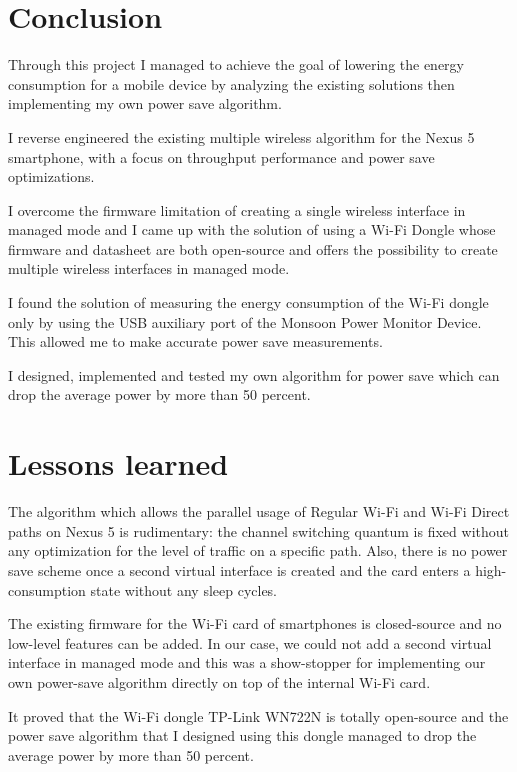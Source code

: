 \section{Conclusion}
\label{sec:conclusion}

Through this project I managed to achieve the goal of lowering the energy consumption for a mobile device by analyzing the existing solutions then implementing my own power save algorithm.

I reverse engineered the existing multiple wireless algorithm for the Nexus 5 smartphone, with a focus on throughput performance and power save optimizations. 

I overcome the firmware limitation of creating a single wireless interface in managed mode and I came up with the solution of using a Wi-Fi Dongle whose firmware and datasheet are both open-source and offers the possibility to create multiple wireless interfaces in managed mode.

I found the solution of measuring the energy consumption of the Wi-Fi dongle only by using the USB auxiliary port of the Monsoon Power Monitor Device. This allowed me to make accurate power save measurements.

I designed, implemented and tested my own algorithm for power save which can drop the average power by more than 50 percent.

\section{Lessons learned}
\label{sec:lessons}

The algorithm which allows the parallel usage of Regular Wi-Fi and Wi-Fi Direct paths on Nexus 5 is rudimentary: the channel switching quantum is fixed without any optimization for the level of traffic on a specific path. Also, there is no power save scheme once a second virtual interface is created and the card enters a high-consumption state without any sleep cycles.

The existing firmware for the Wi-Fi card of smartphones is closed-source and no low-level features can be added. In our case, we could not add a second virtual interface in managed mode and this was a show-stopper for implementing our own power-save algorithm directly on top of the internal Wi-Fi card.

It proved that the Wi-Fi dongle TP-Link WN722N is totally open-source and the power save algorithm that I designed using this dongle managed to drop the average power by more than 50 percent.

